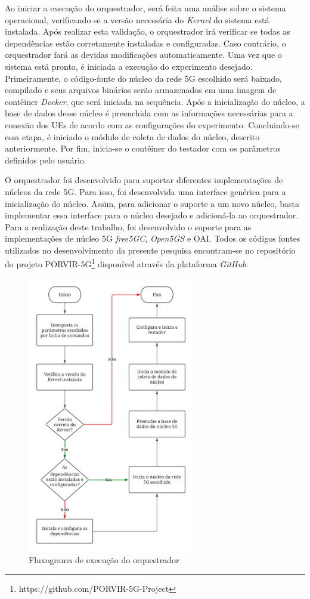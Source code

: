 Ao iniciar a execução do orquestrador, será feita uma análise sobre o sistema operacional, verificando se a versão necessária do \textit{Kernel} do sistema está instalada.
Após realizar esta validação, o orquestrador irá verificar se todas as dependências estão corretamente instaladas e configuradas. Caso contrário, o orquestrador fará as devidas modificações automaticamente.
Uma vez que o sistema está pronto, é iniciada a execução do experimento desejado.
Primeiramente, o código-fonte do núcleo da rede 5G escolhido será baixado, compilado e seus arquivos binários serão armazenados em uma imagem de contêiner \textit{Docker}, que será iniciada na sequência.
Após a inicialização do núcleo, a base de dados desse núcleo é preenchida com as informações necessárias para a conexão dos UEs de acordo com as configurações do experimento.
Concluindo-se essa etapa, é iniciado o módulo de coleta de dados do núcleo, descrito anteriormente.
Por fim, inicia-se o contêiner do testador com os parâmetros definidos pelo usuário.

O orquestrador foi desenvolvido para suportar diferentes implementações de núcleos da rede 5G. Para isso, foi desenvolvida uma interface genérica para a inicialização do núcleo. Assim, para adicionar o suporte a um novo núcleo, basta implementar essa interface para o núcleo desejado e adicioná-la ao orquestrador.
Para a realização deste trabalho, foi desenvolvido o suporte para as implementações de núcleo 5G \textit{free5GC}, \textit{Open5GS} e OAI.
Todos os códigos fontes utilizados no desenvolvimento da presente pesquisa encontram-se no repositório do projeto PORVIR-5G\footnote{https://github.com/PORVIR-5G-Project} disponível através da plataforma \textit{GitHub}.

\begin{figure}[!ht]
    \centering
    \includegraphics[width=0.65\textwidth]{TG2/Chapters/Soluction/Figures/Fluxograma-Orquestrador.pdf}
    \caption{Fluxograma de execução do orquestrador}
    \label{fig:flux_orq}
\end{figure}
